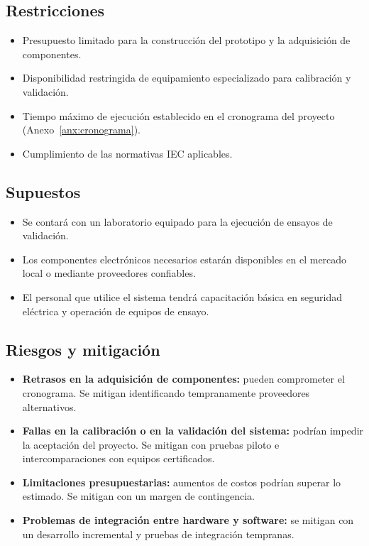 \subsection{Restricciones}
\begin{itemize}
    \item Presupuesto limitado para la construcción del prototipo y la adquisición
          de componentes.
    \item Disponibilidad restringida de equipamiento especializado para
          calibración y validación.
    \item Tiempo máximo de ejecución establecido en el cronograma del proyecto
          (Anexo~\ref{anx:cronograma}).
    \item Cumplimiento de las normativas IEC aplicables.
\end{itemize}

\subsection{Supuestos}
\begin{itemize}
    \item Se contará con un laboratorio equipado para la ejecución de ensayos de
          validación.
    \item Los componentes electrónicos necesarios estarán disponibles en el
          mercado local o mediante proveedores confiables.
    \item El personal que utilice el sistema tendrá capacitación básica en
          seguridad eléctrica y operación de equipos de ensayo.
\end{itemize}

\subsection{Riesgos y mitigación}
\begin{itemize}
    \item \textbf{Retrasos en la adquisición de componentes:} pueden comprometer el
          cronograma. Se mitigan identificando tempranamente proveedores
          alternativos.
    \item \textbf{Fallas en la calibración o en la validación del sistema:} podrían
          impedir la aceptación del proyecto. Se mitigan con pruebas piloto e
          intercomparaciones con equipos certificados.
    \item \textbf{Limitaciones presupuestarias:} aumentos de costos podrían superar
          lo estimado. Se mitigan con un margen de contingencia.
    \item \textbf{Problemas de integración entre hardware y software:} se mitigan
          con un desarrollo incremental y pruebas de integración tempranas.
\end{itemize}

